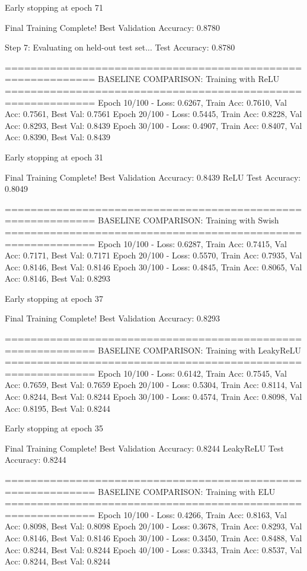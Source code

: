 Early stopping at epoch 71

Final Training Complete!
Best Validation Accuracy: 0.8780

Step 7: Evaluating on held-out test set...
Test Accuracy: 0.8780

============================================================
BASELINE COMPARISON: Training with ReLU
============================================================
Epoch  10/100 - Loss: 0.6267, Train Acc: 0.7610, Val Acc: 0.7561, Best Val: 0.7561
Epoch  20/100 - Loss: 0.5445, Train Acc: 0.8228, Val Acc: 0.8293, Best Val: 0.8439
Epoch  30/100 - Loss: 0.4907, Train Acc: 0.8407, Val Acc: 0.8390, Best Val: 0.8439

Early stopping at epoch 31

Final Training Complete!
Best Validation Accuracy: 0.8439
ReLU Test Accuracy: 0.8049

============================================================
BASELINE COMPARISON: Training with Swish
============================================================
Epoch  10/100 - Loss: 0.6287, Train Acc: 0.7415, Val Acc: 0.7171, Best Val: 0.7171
Epoch  20/100 - Loss: 0.5570, Train Acc: 0.7935, Val Acc: 0.8146, Best Val: 0.8146
Epoch  30/100 - Loss: 0.4845, Train Acc: 0.8065, Val Acc: 0.8146, Best Val: 0.8293

Early stopping at epoch 37

Final Training Complete!
Best Validation Accuracy: 0.8293

============================================================
BASELINE COMPARISON: Training with LeakyReLU
============================================================
Epoch  10/100 - Loss: 0.6142, Train Acc: 0.7545, Val Acc: 0.7659, Best Val: 0.7659
Epoch  20/100 - Loss: 0.5304, Train Acc: 0.8114, Val Acc: 0.8244, Best Val: 0.8244
Epoch  30/100 - Loss: 0.4574, Train Acc: 0.8098, Val Acc: 0.8195, Best Val: 0.8244

Early stopping at epoch 35

Final Training Complete!
Best Validation Accuracy: 0.8244
LeakyReLU Test Accuracy: 0.8244

============================================================
BASELINE COMPARISON: Training with ELU
============================================================
Epoch  10/100 - Loss: 0.4266, Train Acc: 0.8163, Val Acc: 0.8098, Best Val: 0.8098
Epoch  20/100 - Loss: 0.3678, Train Acc: 0.8293, Val Acc: 0.8146, Best Val: 0.8146
Epoch  30/100 - Loss: 0.3450, Train Acc: 0.8488, Val Acc: 0.8244, Best Val: 0.8244
Epoch  40/100 - Loss: 0.3343, Train Acc: 0.8537, Val Acc: 0.8244, Best Val: 0.8244

